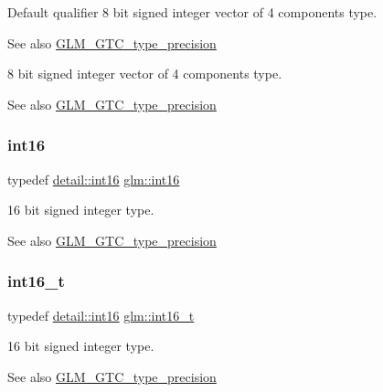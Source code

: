 Default qualifier 8 bit signed integer vector of 4 components type. \begin{DoxySeeAlso}{See also}
\hyperlink{group__gtc__type__precision}{G\+L\+M\+\_\+\+G\+T\+C\+\_\+type\+\_\+precision}
\end{DoxySeeAlso}
8 bit signed integer vector of 4 components type. \begin{DoxySeeAlso}{See also}
\hyperlink{group__gtc__type__precision}{G\+L\+M\+\_\+\+G\+T\+C\+\_\+type\+\_\+precision} 
\end{DoxySeeAlso}
\mbox{\label{group__gtc__type__precision_ga2945a61d12771f8954994fcddf02b021}} 
\subsubsection{\texorpdfstring{int16}{int16}}
{\footnotesize\ttfamily typedef \hyperlink{namespaceglm_1_1detail_a375938874ca4f0a0982ec6373b56117b}{detail\+::int16} \hyperlink{group__gtc__type__precision_ga2945a61d12771f8954994fcddf02b021}{glm\+::int16}}

16 bit signed integer type. \begin{DoxySeeAlso}{See also}
\hyperlink{group__gtc__type__precision}{G\+L\+M\+\_\+\+G\+T\+C\+\_\+type\+\_\+precision} 
\end{DoxySeeAlso}
\mbox{\label{group__gtc__type__precision_gaf89ee61e0d34aa4a462104b7ae7f2da6}} 
\subsubsection{\texorpdfstring{int16\+\_\+t}{int16\_t}}
{\footnotesize\ttfamily typedef \hyperlink{namespaceglm_1_1detail_a375938874ca4f0a0982ec6373b56117b}{detail\+::int16} \hyperlink{group__gtc__type__precision_gaf89ee61e0d34aa4a462104b7ae7f2da6}{glm\+::int16\+\_\+t}}

16 bit signed integer type. \begin{DoxySeeAlso}{See also}
\hyperlink{group__gtc__type__precision}{G\+L\+M\+\_\+\+G\+T\+C\+\_\+type\+\_\+precision} 
\end{DoxySeeAlso}
\mbox{\label{group__gtc__type__precision_ga632d8b25f6b61659f39ea4321fab92a4}} 
